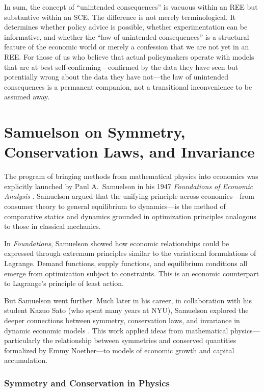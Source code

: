 \documentclass[12pt]{article}
\begin{document}
In sum, the concept of ``unintended consequences'' is vacuous within an REE but substantive within an SCE. The difference is not merely terminological. It determines whether policy advice is possible, whether experimentation can be informative, and whether the ``law of unintended consequences'' is a structural feature of the economic world or merely a confession that we are not yet in an REE. For those of us who believe that actual policymakers operate with models that are at best self-confirming---confirmed by the data they have seen but potentially wrong about the data they have not---the law of unintended consequences is a permanent companion, not a transitional inconvenience to be assumed away.


\appendix


\section{Samuelson on Symmetry, Conservation Laws, and Invariance}

The program of bringing methods from mathematical physics into economics was explicitly launched by Paul A.\ Samuelson in his 1947 \emph{Foundations of Economic Analysis} \cite{Samuelson1947}. Samuelson argued that the unifying principle across economics---from consumer theory to general equilibrium to dynamics---is the method of comparative statics and dynamics grounded in optimization principles analogous to those in classical mechanics.

In \emph{Foundations}, Samuelson showed how economic relationships could be expressed through extremum principles similar to the variational formulations of Lagrange. Demand functions, supply functions, and equilibrium conditions all emerge from optimization subject to constraints. This is an economic counterpart to Lagrange's principle of least action.

But Samuelson went further. Much later in his career, in collaboration with his student Kazuo Sato (who spent many years at NYU), Samuelson explored the deeper connections between symmetry, conservation laws, and invariance in dynamic economic models \cite{SamuelsonSato1984}. This work applied ideas from mathematical physics---particularly the relationship between symmetries and conserved quantities formalized by Emmy Noether---to models of economic growth and capital accumulation.

\subsubsection{Symmetry and Conservation in Physics}
\end{document}

